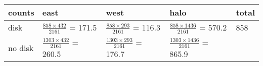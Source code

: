 \documentclass[]{article}
\begin{document}
\begin{longtable}[]{@{}lllll@{}}
\toprule
\begin{minipage}[b]{0.17\columnwidth}\raggedright
counts\strut
\end{minipage} & \begin{minipage}[b]{0.17\columnwidth}\raggedright
east\strut
\end{minipage} & \begin{minipage}[b]{0.17\columnwidth}\raggedright
west\strut
\end{minipage} & \begin{minipage}[b]{0.17\columnwidth}\raggedright
halo\strut
\end{minipage} & \begin{minipage}[b]{0.17\columnwidth}\raggedright
total\strut
\end{minipage}\tabularnewline
\midrule
\endhead
\begin{minipage}[t]{0.17\columnwidth}\raggedright
disk\strut
\end{minipage} & \begin{minipage}[t]{0.17\columnwidth}\raggedright
\(\frac{858 \times 432}{2161}\) = 171.5\strut
\end{minipage} & \begin{minipage}[t]{0.17\columnwidth}\raggedright
\(\frac{858 \times 293}{2161}\) = 116.3\strut
\end{minipage} & \begin{minipage}[t]{0.17\columnwidth}\raggedright
\(\frac{858 \times 1436}{2161}\) = 570.2\strut
\end{minipage} & \begin{minipage}[t]{0.17\columnwidth}\raggedright
858\strut
\end{minipage}\tabularnewline
\begin{minipage}[t]{0.17\columnwidth}\raggedright
no disk\strut
\end{minipage} & \begin{minipage}[t]{0.17\columnwidth}\raggedright
\(\frac{1303 \times 432}{2161}\) = 260.5\strut
\end{minipage} & \begin{minipage}[t]{0.17\columnwidth}\raggedright
\(\frac{1303 \times 293}{2161}\) = 176.7\strut
\end{minipage} & \begin{minipage}[t]{0.17\columnwidth}\raggedright
\(\frac{1303 \times 1436}{2161}\) = 865.9\strut
\end{minipage} & \begin{minipage}[t]{0.17\columnwidth}\raggedright

\end{minipage}
\end{longtable}
\end{document}
